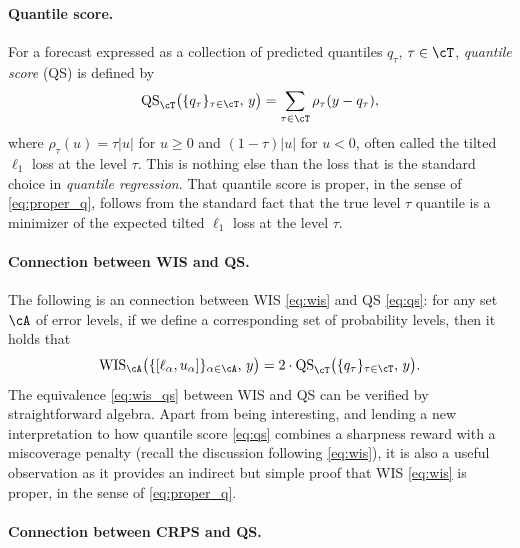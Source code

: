 \documentclass{article}
\begin{document}
\paragraph{Quantile score.}

For a forecast expressed as a collection of predicted quantiles $q_\tau$, $\tau
\in \cT$, \emph{quantile score} (QS) is defined by 
\begin{equation}
\label{eq:qs}
\mathrm{QS}_\cT \big( \{q_\tau\}_{\tau \in \cT}, \, y \big) = 
\sum_{\tau \in \cT} \rho_\tau(y - q_\tau),
\end{equation}
where $\rho_\tau(u) = \tau |u|$ for $u \geq 0$ and $(1-\tau) |u|$ for $u < 0$,
often called the tilted $\ell_1$ loss at the level $\tau$. This is nothing else
than the loss that is the standard choice in \emph{quantile regression}. That
quantile score is proper, in the sense of \eqref{eq:proper_q}, follows from the
standard fact that the true level $\tau$ quantile is a minimizer of the expected
tilted $\ell_1$ loss at the level $\tau$.

\paragraph{Connection between WIS and QS.}

The following is an connection between WIS \eqref{eq:wis} and QS \eqref{eq:qs}: 
for any set $\cA$ of error levels, if we define a corresponding set
 of
probability levels, then it holds that     
\begin{equation}
\label{eq:wis_qs}
\mathrm{WIS}_\cA \big( \{[\ell_\alpha, u_\alpha]\}_{\alpha \in \cA}, \, y \big)  
= 2 \cdot \mathrm{QS}_\cT \big( \{q_\tau\}_{\tau \in \cT}, \, y \big).
\end{equation}
The equivalence \eqref{eq:wis_qs} between WIS and QS can be verified by
straightforward algebra. Apart from being interesting, and lending a new 
interpretation to how quantile score \eqref{eq:qs} combines a sharpness reward
with a miscoverage penalty (recall the discussion following \eqref{eq:wis}), it
is also a useful observation as it provides an indirect but simple proof that
WIS \eqref{eq:wis} is proper, in the sense of \eqref{eq:proper_q}.

\paragraph{Connection between CRPS and QS.}
\end{document}
